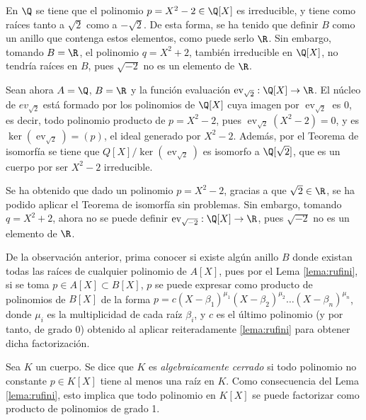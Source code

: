 \begin{obss}
    \item En $\Q$ se tiene que el polinomio $p = X^2 - 2 \in \Q[X]$ es irreducible, y tiene como raíces tanto a $\sqrt{2}$ como a $-\sqrt{2}$. De esta forma, se ha tenido que definir $B$ como un anillo que contenga estos elementos, como puede serlo $\R$. Sin embargo, tomando $B = \R$, el polinomio $q = X^2 + 2$, también irreducible en $\Q[X]$, no tendría raíces en $B$, pues $\sqrt{-2}$ no es un elemento de $\R$.

    \item Sean ahora $A=\Q$, $B= \R$ y la función evaluación $\operatorname{ev}_{\sqrt{2}}: \Q[X] \to \R$. El núcleo de ${ev}_{\sqrt{2}}$ está formado por los polinomios de $\Q[X]$ cuya imagen por $\operatorname{ev}_{\sqrt{2}}$ es $0$, es decir, todo polinomio producto de $p = X^2-2$, pues $\operatorname{ev}_{\sqrt{2}} (X^2-2) = 0$, y es $\ker(\operatorname{ev}_{\sqrt{2}}) = (p)$, el ideal generado por $X^2-2$. Además, por el Teorema de isomorfía se tiene que $Q[X]/\ker(\operatorname{ev}_{\sqrt{2}})$ es isomorfo a $\Q[\sqrt{2}]$, que es un cuerpo por ser $X^2-2$ irreducible.
    
    Se ha obtenido que dado un polinomio $p = X^2 - 2$, gracias a que $\sqrt{2}\in \R$, se ha podido aplicar el Teorema de isomorfía sin problemas. Sin embargo, tomando $q = X^2 + 2$, ahora no se puede definir $\operatorname{ev}_{\sqrt{-2}}: \Q[X] \to \R$, pues $\sqrt{-2}$ no es un elemento de $\R$.
\end{obss}

De la observación anterior, prima conocer si existe algún anillo $B$ donde existan todas las raíces de cualquier polinomio de $A[X]$, pues por el Lema \ref{lema:rufini}, si se toma $p\in A[X] \subset B[X]$, $p$ se puede expresar como producto de polinomios de $B[X]$ de la forma $p = c(X-\beta_1)^{\mu_1}(X-\beta_2)^{\mu_2}\ldots(X-\beta_n)^{\mu_n}$, donde $\mu_i$ es la multiplicidad de cada raíz $\beta_i$, y $c$ es el último polinomio (y por tanto, de grado 0) obtenido al aplicar reiteradamente \ref{lema:rufini} para obtener dicha factorización.

\begin{deff}{\cite[p.~91]{Rosenberger}}
Sea $K$ un cuerpo. Se dice que $K$ es \textit{algebraicamente cerrado} si todo polinomio no constante $p \in K[X]$ tiene al menos una raíz en $K$. Como consecuencia del Lema \ref{lema:rufini}, esto implica que todo polinomio en $K[X]$ se puede factorizar como producto de polinomios de grado 1.
\end{deff}

